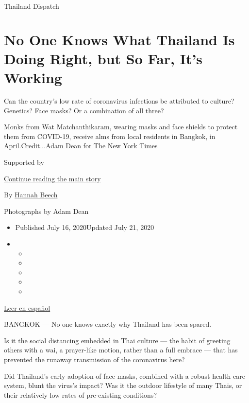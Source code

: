 Thailand Dispatch

\hypertarget{no-one-knows-what-thailand-is-doing-right-but-so-far-its-working}{%
\section{No One Knows What Thailand Is Doing Right, but So Far, It's
Working}\label{no-one-knows-what-thailand-is-doing-right-but-so-far-its-working}}

Can the country's low rate of coronavirus infections be attributed to
culture? Genetics? Face masks? Or a combination of all three?

Monks from Wat Matchanthikaram, wearing masks and face shields to
protect them from COVID-19, receive alms from local residents in
Bangkok, in April.Credit...Adam Dean for The New York Times

Supported by

\protect\hyperlink{after-sponsor}{Continue reading the main story}

By \href{https://www.nytimes3xbfgragh.onion/by/hannah-beech}{Hannah
Beech}

Photographs by Adam Dean

\begin{itemize}
\item
  Published July 16, 2020Updated July 21, 2020
\item
  \begin{itemize}
  \item
  \item
  \item
  \item
  \item
  \end{itemize}
\end{itemize}

\href{https://www.nytimes3xbfgragh.onion/es/2020/07/21/espanol/mundo/coronavirus-tailandia.html}{Leer
en español}

BANGKOK --- No one knows exactly why Thailand has been spared.

Is it the social distancing embedded in Thai culture --- the habit of
greeting others with a wai, a prayer-like motion, rather than a full
embrace --- that has prevented the runaway transmission of the
coronavirus here?

Did Thailand's early adoption of face masks, combined with a robust
health care system, blunt the virus's impact? Was it the outdoor
lifestyle of many Thais, or their relatively low rates of pre-existing
conditions?

